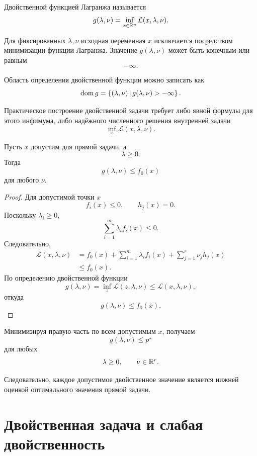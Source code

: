 \begin{definition}
Двойственной функцией Лагранжа называется
\[
    g(\lambda,\nu)
    =
    \inf_{x\in\mathbb{R}^n}
    \mathcal L(x,\lambda,\nu).
\]
\end{definition}

Для фиксированных \(\lambda,\nu\) исходная переменная \(x\)
исключается посредством минимизации функции Лагранжа. Значение
\(g(\lambda,\nu)\) может быть конечным или равным
\[
    -\infty.
\]

Область определения двойственной функции можно записать как
\[
    \operatorname{dom} g
    =
    \left\{ (\lambda,\nu) \,\middle|\, 
        g(\lambda,\nu)>-\infty
     \right\}.
\]

Практическое построение двойственной задачи требует либо явной
формулы для этого инфимума, либо надёжного численного решения
внутренней задачи
\[
    \inf_x\mathcal L(x,\lambda,\nu).
\]



\begin{theorem}
Пусть \(x\) допустим для прямой задачи, а
\[
    \lambda\ge0.
\]
Тогда
\[
    g(\lambda,\nu)\le f_0(x)
\]
для любого \(\nu\).
\end{theorem}

\begin{proof}
Для допустимой точки \(x\)
\[
    f_i(x)\le0,
    \qquad
    h_j(x)=0.
\]
Поскольку \(\lambda_i\ge0\),
\[
    \sum_{i=1}^{m}\lambda_i f_i(x)\le0.
\]
Следовательно,
\[
\begin{aligned}
    \mathcal L(x,\lambda,\nu)
    &=
    f_0(x)
    +
    \sum_{i=1}^{m}\lambda_i f_i(x)
    +
    \sum_{j=1}^{r}\nu_j h_j(x)
    \\
    &\le
    f_0(x).
\end{aligned}
\]
По определению двойственной функции
\[
    g(\lambda,\nu)
    =
    \inf_z\mathcal L(z,\lambda,\nu)
    \le
    \mathcal L(x,\lambda,\nu),
\]
откуда
\[
    g(\lambda,\nu)\le f_0(x).
\]
\end{proof}

Минимизируя правую часть по всем допустимым \(x\), получаем
\[
    g(\lambda,\nu)\le p^\star
\]
для любых
\[
    \lambda\ge0,\qquad \nu\in\mathbb{R}^r.
\]

Следовательно, каждое допустимое двойственное значение является
нижней оценкой оптимального значения прямой задачи.

\section{Двойственная задача и слабая двойственность}

